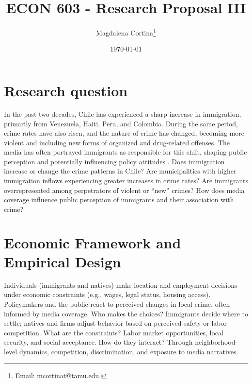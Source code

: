 




\title{\Large \textbf{ECON 603 - Research Proposal III}}

\author{Magdalena Cortina\thanks{Email: mcortinat@tamu.edu.}} 
\date{\today}

\maketitle
\thispagestyle{empty} 
\doublespacing
\thispagestyle{empty} 

\vspace{-10mm}

\doublespacing

\section{ Research question}

In the past two decades, Chile has experienced a sharp increase in immigration, primarily from Venezuela, Haiti, Peru, and Colombia. During the same period, crime rates have also risen, and the nature of crime has changed, becoming more violent and including new forms of organized and drug-related offenses. The media has often portrayed immigrants as responsible for this shift, shaping public perception and potentially influencing policy attitudes \citep{valenzuela2019media}. Does immigration increase or change the crime patterns in Chile? Are municipalities with higher immigration inflows experiencing greater increases in crime rates? Are immigrants overrepresented among perpetrators of violent or “new” crimes? How does media coverage influence public perception of immigrants and their association with crime?

\section{ Economic Framework and Empirical Design}

Individuals (immigrants and natives) make location and employment decisions under economic constraints (e.g., wages, legal status, housing access). Policymakers and the public react to perceived changes in local crime, often informed by media coverage. 
Who makes the choices? Immigrants decide where to settle; natives and firms adjust behavior based on perceived safety or labor competition.
What are the constraints? Labor market opportunities, local security, and social acceptance.
How do they interact? Through neighborhood-level dynamics, competition, discrimination, and exposure to media narratives.

